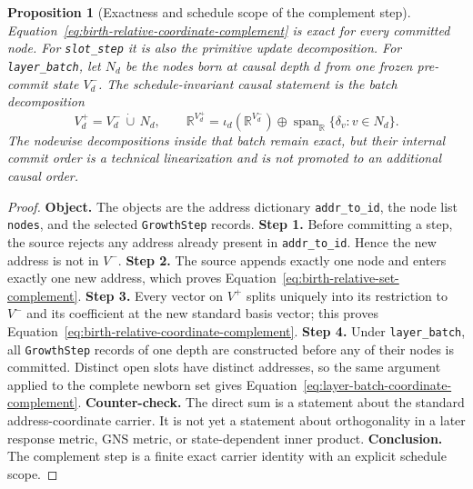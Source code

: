 \documentclass[11pt]{article}
\newtheorem{proposition}[definition]{Proposition}
\theoremstyle{remark}
\newcommand{\code}[1]{\texttt{#1}}
\newcommand{\R}{\mathbb{R}}
\numberwithin{equation}{section}
\begin{document}
\begin{proposition}[Exactness and schedule scope of the complement step]
Equation~\eqref{eq:birth-relative-coordinate-complement} is exact for every committed node. For \code{slot\_step} it is also the primitive update decomposition. For \code{layer\_batch}, let $N_d$ be the nodes born at causal depth $d$ from one frozen pre-commit state $V_d^-$. The schedule-invariant causal statement is the batch decomposition
\begin{equation}
  V_d^+=V_d^-\,\dot\cup\,N_d,
  \qquad
  \R^{V_d^+}
  =\iota_d(\R^{V_d^-})\oplus
    \operatorname{span}_{\R}\{\delta_v:v\in N_d\}.
  \label{eq:layer-batch-coordinate-complement}
\end{equation}
The nodewise decompositions inside that batch remain exact, but their internal commit order is a technical linearization and is not promoted to an additional causal order.
\end{proposition}
\begin{proof}
\textbf{Object.} The objects are the address dictionary \code{addr\_to\_id}, the node list \code{nodes}, and the selected \code{GrowthStep} records. \textbf{Step 1.} Before committing a step, the source rejects any address already present in \code{addr\_to\_id}. Hence the new address is not in $V^-$. \textbf{Step 2.} The source appends exactly one node and enters exactly one new address, which proves Equation~\eqref{eq:birth-relative-set-complement}. \textbf{Step 3.} Every vector on $V^+$ splits uniquely into its restriction to $V^-$ and its coefficient at the new standard basis vector; this proves Equation~\eqref{eq:birth-relative-coordinate-complement}. \textbf{Step 4.} Under \code{layer\_batch}, all \code{GrowthStep} records of one depth are constructed before any of their nodes is committed. Distinct open slots have distinct addresses, so the same argument applied to the complete newborn set gives Equation~\eqref{eq:layer-batch-coordinate-complement}. \textbf{Counter-check.} The direct sum is a statement about the standard address-coordinate carrier. It is not yet a statement about orthogonality in a later response metric, GNS metric, or state-dependent inner product. \textbf{Conclusion.} The complement step is a finite exact carrier identity with an explicit schedule scope.
\end{proof}
\end{document}
